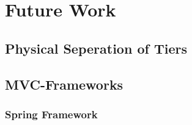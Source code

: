 \chapter{Future Work}
\section{Physical Seperation of Tiers}
\section{MVC-Frameworks}
\subsection{Spring Framework}